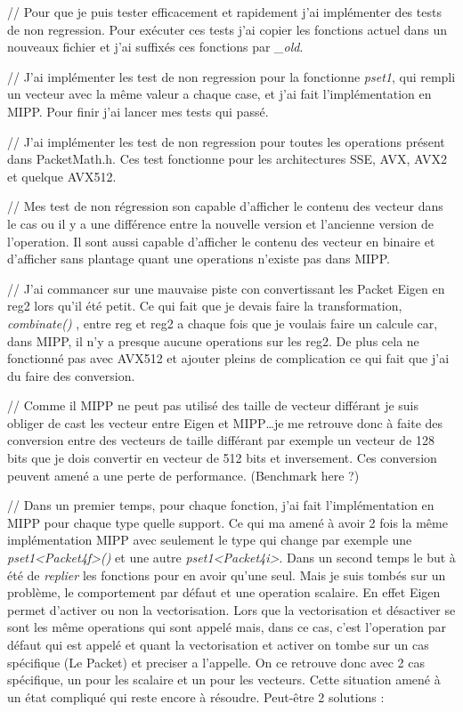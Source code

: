 // Pour que je puis tester efficacement et rapidement j'ai implémenter des tests de non
regression. Pour exécuter ces tests j'ai copier les fonctions actuel dans un nouveaux
fichier et j'ai suffixés ces fonctions par \emph{\_old}.

// J'ai implémenter les test de non regression pour la fonctionne \emph{pset1}, qui
rempli un vecteur avec la même valeur a chaque case, et j'ai fait l'implémentation en
MIPP. Pour finir j'ai lancer mes tests qui passé.

// J'ai implémenter les test de non regression pour toutes les operations présent dans
PacketMath.h. Ces test fonctionne pour les architectures SSE, AVX, AVX2 et quelque AVX512.

// Mes test de non régression son capable d'afficher le contenu des vecteur dans le cas
ou il y a une différence entre la nouvelle version et l'ancienne version de l'operation.
Il sont aussi capable d'afficher le contenu des vecteur en binaire et d'afficher sans
plantage quant une operations n'existe pas dans MIPP.


// J'ai commancer sur une mauvaise piste con convertissant les Packet Eigen en reg2
lors qu'il été petit. Ce qui fait que je devais faire la transformation, \emph{combinate()}
, entre reg et reg2 a chaque fois que je voulais faire un calcule car, dans MIPP, il
n'y a presque aucune operations sur les reg2. De plus cela ne fonctionné pas avec AVX512
et ajouter pleins de complication ce qui fait que j'ai du faire des conversion.

// Comme il MIPP ne peut pas utilisé des taille de vecteur différant je suis obliger de
cast les vecteur entre Eigen et MIPP\dots je me retrouve donc à faite des conversion
entre des vecteurs de taille différant par exemple un vecteur de 128 bits que je dois
convertir en vecteur de 512 bits et inversement. Ces conversion peuvent amené a une
perte de performance. (Benchmark here ?)

// Dans un premier temps, pour chaque fonction, j'ai fait l'implémentation en MIPP pour
chaque type quelle support. Ce qui ma amené à avoir 2 fois la même implémentation MIPP
avec seulement le type qui change par exemple une \emph{pset1<Packet4f>()} et une autre
\emph{pset1<Packet4i>}. Dans un second temps le but à été de \textit{replier} les
fonctions pour en avoir qu'une seul. Mais je suis tombés sur un problème, le
comportement par défaut et une operation scalaire. En effet Eigen permet d'activer
ou non la vectorisation. Lors que la vectorisation et désactiver se sont les même
operations qui sont appelé mais, dans ce cas, c'est l'operation par défaut qui est
appelé et quant la vectorisation et activer on tombe sur un cas spécifique (Le Packet)
et preciser a l'appelle. On ce retrouve donc avec 2 cas spécifique, un pour les scalaire
et un pour les vecteurs. Cette situation amené à un état compliqué qui reste encore à
résoudre. Peut-être 2 solutions :

